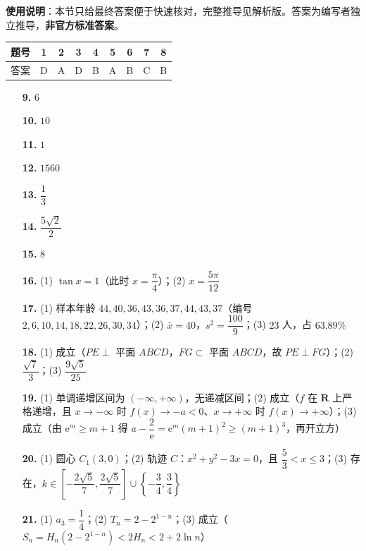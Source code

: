 
\begin{gknotice}
\textbf{使用说明}：本节只给最终答案便于快速核对，完整推导见解析版。答案为编写者独立推导，\textbf{非官方标准答案}。
\end{gknotice}

\begin{center}\begin{tabular}{ccccccccc}
\toprule
题号 & 1 & 2 & 3 & 4 & 5 & 6 & 7 & 8 \\
\midrule
答案 & D & A & D & B & A & B & C & B \\
\bottomrule
\end{tabular}\end{center}

\begin{itemize}[leftmargin=2.6em]
  \item[\textbf{9.}] \(6\)
  \item[\textbf{10.}] \(10\)
  \item[\textbf{11.}] \(1\)
  \item[\textbf{12.}] \(1560\)
  \item[\textbf{13.}] \(\dfrac{1}{3}\)
  \item[\textbf{14.}] \(\dfrac{5\sqrt{2}}{2}\)
  \item[\textbf{15.}] \(8\)
\end{itemize}

\begin{itemize}[leftmargin=2.6em]
  \item[\textbf{16.}] (1) \(\tan x=1\)（此时 \(x=\dfrac{\pi}{4}\)）；(2) \(x=\dfrac{5\pi}{12}\)
  \item[\textbf{17.}] (1) 样本年龄 \(44,40,36,43,36,37,44,43,37\)（编号 \(2,6,10,14,18,22,26,30,34\)）；(2) \(\bar{x}=40\)，\(s^2=\dfrac{100}{9}\)；(3) \(23\) 人，占 \(63.89\%\)
  \item[\textbf{18.}] (1) 成立（\(PE\perp\) 平面 \(ABCD\)，\(FG\subset\) 平面 \(ABCD\)，故 \(PE\perp FG\)）；(2) \(\dfrac{\sqrt{7}}{3}\)；(3) \(\dfrac{9\sqrt{5}}{25}\)
  \item[\textbf{19.}] (1) 单调递增区间为 \((-\infty,+\infty)\)，无递减区间；(2) 成立（\(f\) 在 \(\mathbf{R}\) 上严格递增，且 \(x\to-\infty\) 时 \(f(x)\to-a<0\)、\(x\to+\infty\) 时 \(f(x)\to+\infty\)）；(3) 成立（由 \(\mathrm{e}^m\geqslant m+1\) 得 \(a-\dfrac{2}{\mathrm{e}}=\mathrm{e}^m(m+1)^2\geqslant(m+1)^3\)，再开立方）
  \item[\textbf{20.}] (1) 圆心 \(C_1(3,0)\)；(2) 轨迹 \(C\)：\(x^2+y^2-3x=0\)，且 \(\dfrac{5}{3}<x\leqslant3\)；(3) 存在，\(k\in\left[-\dfrac{2\sqrt{5}}{7},\dfrac{2\sqrt{5}}{7}\right]\cup\left\{-\dfrac{3}{4},\dfrac{3}{4}\right\}\)
  \item[\textbf{21.}] (1) \(a_3=\dfrac{1}{4}\)；(2) \(T_n=2-2^{1-n}\)；(3) 成立（\(S_n=H_n\left(2-2^{1-n}\right)<2H_n<2+2\ln n\)）
\end{itemize}
